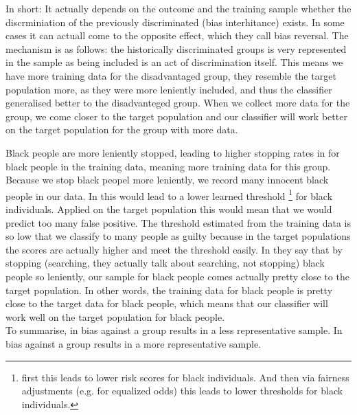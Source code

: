 In short: It actually depends on the outcome and the training sample whether the discrminiation of the previously discriminated (bias interhitance) exists. In some cases it can actuall come to the opposite effect, which they call bias reversal.
The mechanism is as follows: the historically discriminated groups is very represented in the sample as being included is an act of discrimination itself. This means we have more training data for the disadvantaged group, they resemble the target population more, as they were more leniently included, and thus the classifier generalised better to the disadvanteged group.
When we collect more data for the group, we come closer to the target population and our classifier will work better on the target population for the group with more data.


Black people are more leniently stopped, leading to higher stopping rates in for black people in the training data, meaning
more training data for this group. Because we stop black peopel more leniently, we record many innocent black people in our data.
In \cite{kallus2018} this would lead to a lower learned threshold \footnote{first this leads to lower risk scores for black individuals. And then via fairness adjustments (e.g. for equalized odds) this leads to lower thresholds for black individuals.}
for black individuals. Applied on the target population this would mean that we would predict too many false positive. The threshold estimated from the training 
data is so low that we classify to many people as guilty because in the target populations the scores are actually higher and meet the threshold easily.
In \cite{RambachanBBOEFW} they say that by stopping (searching, they actually talk about searching, not stopping) black people so leniently, our sample for black people comes actually pretty
close to the target population.
In other words, the training data for black people is pretty close to the target data for black people, which means that our classifier will work well on the
target population for black people. \\
To summarise, in \cite{kallus2018} bias against a group results in a less representative sample. In \cite{RambachanBBOEFW} bias against a group results in a more representative sample.


